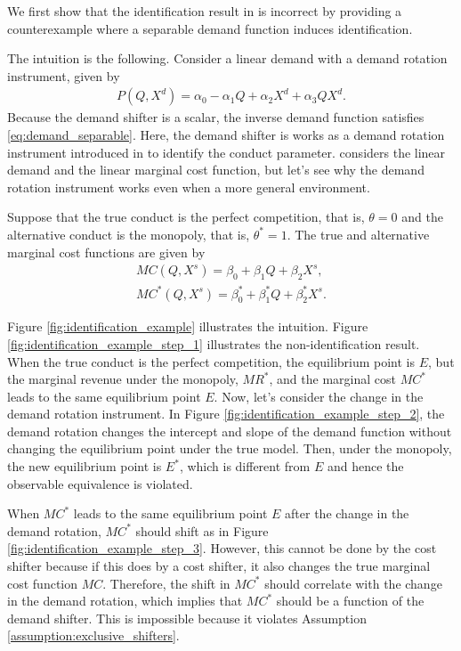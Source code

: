 \documentclass[11pt, a4paper]{article}
\theoremstyle{remark}
\begin{document}
We first show that the identification result in \citet{lau1982identifying} is incorrect by providing a counterexample where a separable demand function induces identification.

The intuition is the following.
Consider a linear demand with a demand rotation instrument, given by
\begin{align}
    P(Q, X^{d}) = \alpha_0 - \alpha_1Q + \alpha_2X^{d} + \alpha_3QX^{d}. \label{eq:demand_counterexample}
\end{align}
Because the demand shifter is a scalar, the inverse demand function satisfies \eqref{eq:demand_separable}.
Here, the demand shifter is works as a demand rotation instrument introduced in \citet{bresnahan1982oligopoly} to identify the conduct parameter.
\citet{bresnahan1982oligopoly} considers the linear demand and the linear marginal cost function, but let's see why the demand rotation instrument works even when a more general environment.


Suppose that the true conduct is the perfect competition, that is, $\theta = 0$ and the alternative conduct is the monopoly, that is, $\theta^{*} = 1$.
The true and alternative marginal cost functions are given by
\begin{align}
    MC(Q, X^{s}) = \beta_0 + \beta_1Q + \beta_2X^{s}, \label{eq:mc_true}\\
    MC^{*}(Q, X^{s}) = \beta_0^{*} + \beta_1^{*}Q + \beta_2^{*}X^{s}. \label{eq:mc_alternative}
\end{align}

Figure \ref{fig:identification_example} illustrates the intuition.
Figure \ref{fig:identification_example_step_1} illustrates the non-identification result.
When the true conduct is the perfect competition, the equilibrium point is $E$, but the marginal revenue under the monopoly, $MR^{*}$, and the marginal cost $MC^{*}$ leads to the same equilibrium point $E$.
Now, let's consider the change in the demand rotation instrument.
In Figure \ref{fig:identification_example_step_2}, the demand rotation changes the intercept and slope of the demand function without changing the equilibrium point under the true model.
Then, under the monopoly, the new equilibrium point is $E^{*}$, which is different from $E$ and hence the observable equivalence is violated.

When $MC^{*}$ leads to the same equilibrium point $E$ after the change in the demand rotation, $MC^{*}$ should shift as in Figure \ref{fig:identification_example_step_3}.
However, this cannot be done by the cost shifter because if this does by a cost shifter, it also changes the true marginal cost function $MC$.
Therefore, the shift in $MC^{*}$ should correlate with the change in the demand rotation, which implies that $MC^{*}$ should be a function of the demand shifter.
This is impossible because it violates Assumption \ref{assumption:exclusive_shifters}.
\end{document}
